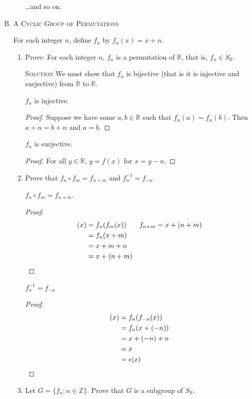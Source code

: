 \documentclass[twoside]{amsart}
\newcommand{\Reals}{\ensuremath{\mathbb{R}}\xspace}
\newcommand{\Integers}{\ensuremath{\mathbb{Z}{}}\xspace}
\newcommand{\solution}{\textsc{Solution}\xspace}
\newcommand{\eps}{\ensuremath{\epsilon}\xspace}
\begin{document}
\begin{enumerate}[A.]
\begin{enumerate}[1]
      \dots and so on.
   \end{enumerate}

   \item \textsc{A Cyclic Group of Permutations}

   \noindent For each integer $n$, define $f_n$ by $f_n(x)=x+n$.
   \begin{enumerate}[1]
      \item Prove: For each integer $n$, $f_n$ is a permutation of \Reals,
      that is, $f_n \in S_{\mathbb{R}}$.

      \solution We must show that $f_n$ is bijective (that is it is
       injective and surjective) from \Reals to \Reals.

      $f_n$ is injective. 
      \begin{proof}
         Suppose we have some $a,b \in \Reals$ such that
	  $f_n(a)=f_n(b)$. Then $a+n=b+n$ and $a=b$.
      \end{proof}
      $f_n$ is surjective.
      \begin{proof}
         For all $y \in \Reals$, $y=f(x)$ for $x=y-n$.
      \end{proof}

      \item Prove that $f_n \circ f_m = f_{n+m}$ and $f_n^{-1} = f_{-n}$.

      $f_n \circ f_m = f_{n+m}$.
      \begin{proof}
      \begin{align*}
          [f_n \circ f_m](x) &= f_n(f_m(x)) & f_{n+m} &= x + (n+m) \\
	                     &= f_n(x + m) \\
			     &= x + m + n \\
			     &= x + (n+m) \qedhere
      \end{align*}
      \end{proof}
      $f_n^{-1} = f_{-n}$
      \begin{proof}
      \begin{align*}
         [f_n \circ f_{-n}](x) &= f_n(f_{-n}(x)) \\
	                       &= f_n(x + (-n))  \\
			       &= x + (-n) + n \\
			       &= x \\
			       &= \eps(x) \qedhere
      \end{align*}
      \end{proof}

      \item Let $G=\{f_n : n \in \Integers\}$. Prove that $G$ is a subgroup
      of $S_{\Reals}$.


\end{enumerate}
\end{enumerate}
\end{document}
